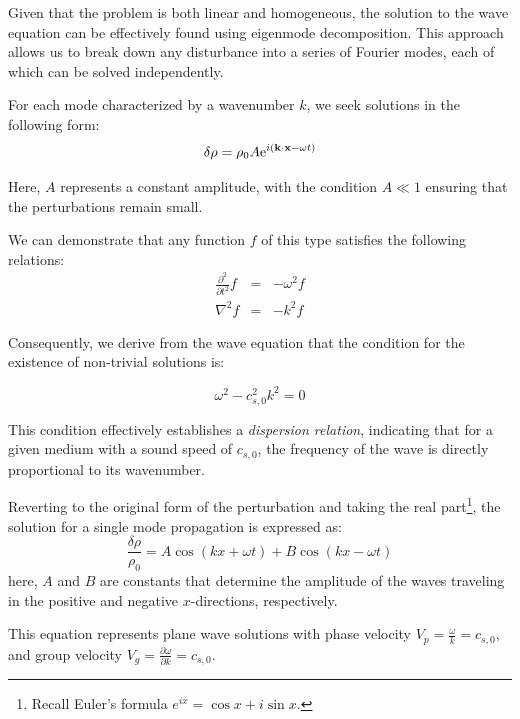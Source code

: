 Given that the problem is both linear and homogeneous, the solution to the wave equation can be effectively found using eigenmode decomposition. This approach allows us to break down any disturbance into a series of Fourier modes, each of which can be solved independently.

For each mode characterized by a wavenumber \( k \), we seek solutions in the following form:
%
\begin{equation}
\delta \rho = \rho_0 A {\rm e}^{i(\vb k \cdot \vb x - \omega t)}
\end{equation}

Here, \( A \) represents a constant amplitude, with the condition \( A \ll 1 \) ensuring that the perturbations remain small.

We can demonstrate that any function \( f \) of this type satisfies the following relations:
%
\begin{eqnarray}
\frac{\partial^2}{\partial t^2} f & = & - \omega^2 f \\
\nabla^2 f & = & -k^2 f
\end{eqnarray}

Consequently, we derive from the wave equation that the condition for the existence of non-trivial solutions is:
%
\begin{remark}
\begin{equation}
\omega^2 - c_{s,0}^2 k^2 = 0
\end{equation}
\end{remark}

This condition effectively establishes a \emph{dispersion relation}, indicating that for a given medium with a sound speed of \( c_{s,0} \), the frequency of the wave is directly proportional to its wavenumber. 

Reverting to the original form of the perturbation and taking the real part\footnote{Recall Euler's formula \( e^{ix} = \cos x + i \sin x \).}, the solution for a single mode propagation is expressed as:
%
\begin{equation}
\frac{\delta \rho}{\rho_0} = A \cos(kx + \omega t) + B \cos(kx - \omega t) 
\end{equation}
%
here, \( A \) and \( B \) are constants that determine the amplitude of the waves traveling in the positive and negative \( x \)-directions, respectively.

This equation represents plane wave solutions with phase velocity \( V_p = \frac{\omega}{k} = c_{s,0} \), and group velocity \( V_g = \frac{\partial \omega}{\partial k} = c_{s,0} \).

